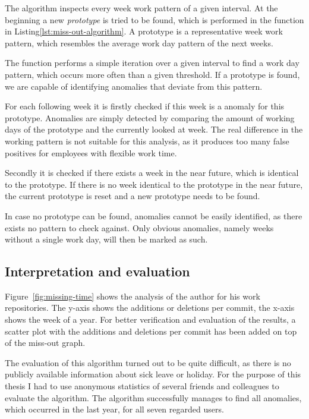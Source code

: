 The algorithm inspects every week work pattern of a given interval.
At the beginning a new \emph{prototype} is tried to be found, which is performed in the function  in Listing\ref{lst:miss-out-algorithm}.
A prototype is a representative week work pattern, which resembles the average work day pattern of the next weeks.

The function performs a simple iteration over a given interval to find a work day pattern, which occurs more often than a given threshold.
If a prototype is found, we are capable of identifying anomalies that deviate from this pattern.

For each following week it is firstly checked if this week is a anomaly for this prototype.
Anomalies are simply detected by comparing the amount of working days of the prototype and the currently looked at week.
The real difference in the working pattern is not suitable for this analysis, as it produces too many false positives for employees with flexible work time.

Secondly it is checked if there exists a week in the near future, which is identical to the prototype.
If there is no week identical to the prototype in the near future, the current prototype is reset and a new prototype needs to be found.

In case no prototype can be found, anomalies cannot be easily identified, as there exists no pattern to check against.
Only obvious anomalies, namely weeks without a single work day, will then be marked as such.


\subsection{Interpretation and evaluation}

Figure~\ref{fig:missing-time} shows the analysis of the author for his work repositories.
The y-axis shows the additions or deletions per commit, the x-axis shows the week of a year.
For better verification and evaluation of the results, a scatter plot with the additions and deletions per commit has been added on top of the miss-out graph.

The evaluation of this algorithm turned out to be quite difficult, as there is no publicly available information about sick leave or holiday.
For the purpose of this thesis I had to use anonymous statistics of several friends and colleagues to evaluate the algorithm.
The algorithm successfully manages to find all anomalies, which occurred in the last year, for all seven regarded users.

